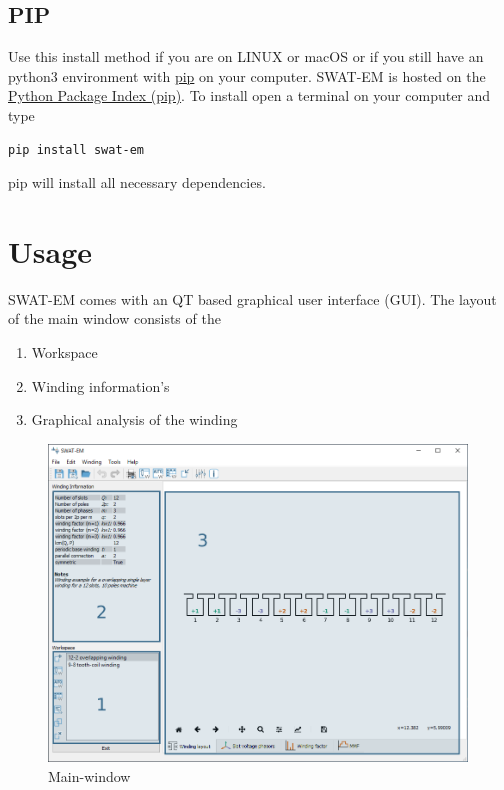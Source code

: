 \documentclass[]{scrreprt}
\begin{document}
\section{PIP}
%
Use this install method if you are on LINUX or macOS or if you still have an python3 environment with
\href{https://pypi.org/project/pip/}{pip} on your computer. SWAT-EM is hosted on the 
\href{https://pypi.org/}{Python Package Index (pip)}. To install open a terminal on your computer
and type 
\begin{lstlisting}
pip install swat-em
\end{lstlisting}
pip will install all necessary dependencies. 
%
%
\chapter{Usage}
%
SWAT-EM comes with an QT based graphical user interface (GUI). The layout of the main window consists of the
\begin{enumerate}
 \item Workspace
 \item Winding information's
 \item Graphical analysis of the winding
\end{enumerate}


%
\begin{figure}[htpb]
    \centering
    \includegraphics[width=0.99\textwidth,angle=0]{fig/mainwindow}
    \caption{Main-window}
    \label{fig:mainwindow}
\end{figure}
%
\end{document}
